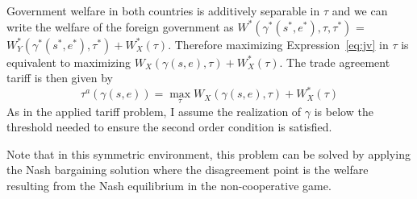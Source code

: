 \documentclass[12pt,titlepage]{article}
\newcommand{\ga}{\gamma}
\begin{document}
Government welfare in both countries is additively separable in $\tau$ and we can write the welfare of the foreign government as $W^*(\ga^*(s^*,e^*),\tau,\tau^*)$ = $W_Y^*(\ga^*(s^*,e^*),\tau^*) + W_X^*(\tau)$. Therefore maximizing Expression~\ref{eq:jv} in $\tau$ is equivalent to maximizing $W_X(\ga(s,e),\tau) + W_X^*(\tau)$. The trade agreement tariff is then given by
\begin{equation}
  \tau^a(\ga(s,e)) = \max_\tau W_X(\ga(s,e),\tau) + W_X^*(\tau)
  \label{eq:eff}
\end{equation}
As in the applied tariff problem, I assume the realization of $\ga$ is below the threshold needed to ensure the second order condition is satisfied.

Note that in this symmetric environment, this problem can be solved by applying the Nash bargaining solution where the disagreement point is the welfare resulting from the Nash equilibrium in the non-cooperative game.
\end{document}
